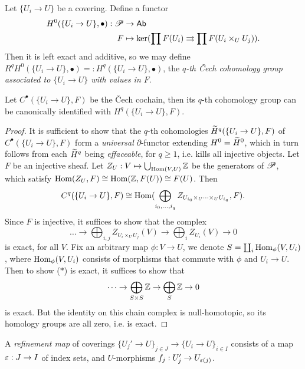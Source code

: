 \documentclass[11pt]{amsart}
\begin{document}
\begin{defn}
    Let $\{U_i\to U\}$ be a covering. Define a functor
    \begin{align*}
        H^0(\{U_i\to U\}, \bullet): \mathscr{P}&\to \mathsf{Ab} \\
        F &\mapsto \ker(\prod F(U_i) \rightrightarrows \prod F(U_i\times_U U_j)).
    \end{align*}
    Then it is left exact and additive, so we may define $R^qH^0(\{U_i\to U\}, \bullet) =: H^q(\{U_i\to U\}, \bullet)$, the \emph{$q$-th \v{C}ech cohomology group associated to $\{U_i\to U\}$ with values in $F$}.
\end{defn}


\begin{thm}
    Let $C^{\bullet}(\{U_i\to U\}, F)$ be the \v{C}ech cochain, then its $q$-th cohomology group can be canonically identified with $H^q(\{U_i\to U\}, F)$.
\end{thm}


\begin{proof}
    It is sufficient to show that the $q$-th cohomologies $\widetilde{H}^q(\{U_i\to U\}, F)$ of $C^{\bullet}(\{U_i\to U\}, F)$ form a \emph{universal} $\partial$-functor extending $H^0 = \widetilde{H}^0$, which in turn follows from each $\widetilde{H}^q$ being \emph{effaceable}, for $q\ge 1$, i.e. kills all injective objects. Let $F$ be an injective sheaf. Let $Z_U: V\mapsto \bigcup_{\operatorname{Hom}(V, U)} \mathbb{Z}$ be the generators of $\mathscr{P}$, which satisfy $\operatorname{Hom}(Z_U, F) \cong \operatorname{Hom}(\mathbb{Z}, F(U)) \cong F(U)$. Then
    \[C^q(\{U_i\to U\}, F) \cong \operatorname{Hom}(\bigoplus_{i_0,\dots,i_q} Z_{U_{i_0}\times_U \dots \times_U U_{i_q}}, F).\]
    Since $F$ is injective, it suffices to show that the complex
    \[\dots \to \bigoplus_{i,j} Z_{U_i \times_U U_j}(V) \to \bigoplus_i Z_{U_i}(V) \to 0 \tag{$\ast$}\]
    is exact, for all $V$. Fix an arbitrary map $\phi: V\to U$, we denote $S = \coprod_i \operatorname{Hom}_{\phi}(V, U_i)$, where $\operatorname{Hom}_{\phi}(V, U_i)$ consists of morphisms that commute with $\phi$ and $U_i\to U$. Then to show ($\ast$) is exact, it suffices to show that
    \[\dots \to \bigoplus_{S\times S} \mathbb{Z} \to \bigoplus_{S} \mathbb{Z}\to 0\]
    is exact. But the identity on this chain complex is null-homotopic, so its homology groups are all zero, i.e. is exact.
\end{proof}



\begin{defn}
    A \emph{refinement map} of coverings $\{U_j'\to U\}_{j\in J} \to \{U_i\to U\}_{i\in I}$ consists of a map $\varepsilon: J\to I$ of index sets, and $U$-morphisms $f_j:U_j' \to U_{\varepsilon(j)}$.
\end{defn}
\end{document}
